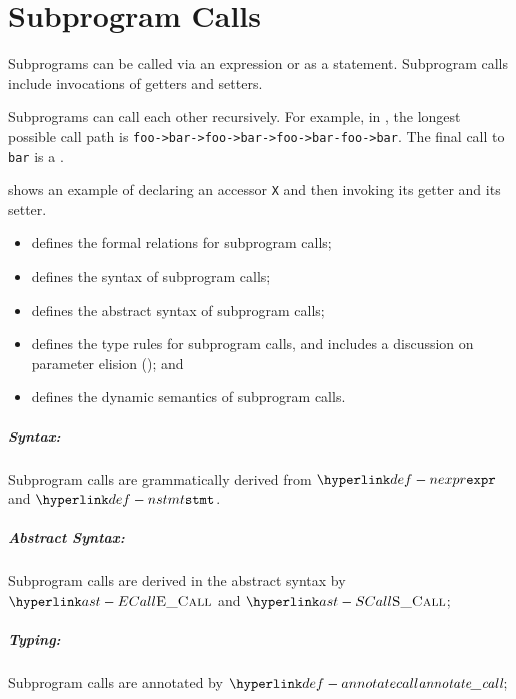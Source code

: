 \chapter{Subprogram Calls\label{chap:SubprogramCalls}}

Subprograms can be called via an expression or as a statement.
Subprogram calls include invocations of getters and setters.

Subprograms can call each other recursively.
For example, in ,
the longest possible call path is \verb|foo->bar->foo->bar->foo->bar-foo->bar|.
The final call to \verb|bar| is a \dynamicerrorterm.

 shows an example of declaring an accessor \verb|X|
and then invoking its getter and its setter.

\ChapterOutline
\begin{itemize}
  \item {} defines the formal relations for subprogram calls;
  \item {} defines the syntax of subprogram calls;
  \item {} defines the abstract syntax of subprogram calls;
  \item {} defines the type rules for subprogram calls,
        and includes a discussion on parameter elision (); and
  \item {} defines the dynamic semantics of subprogram calls.
\end{itemize}

\paragraph{Syntax:} Subprogram calls are grammatically derived from $\Nexpr$ and $\Nstmt$.
\paragraph{Abstract Syntax:} Subprogram calls are derived in the abstract syntax by
  $\ECall$ and $\SCall$;
\paragraph{Typing:} Subprogram calls are annotated by $\annotatecall$;
